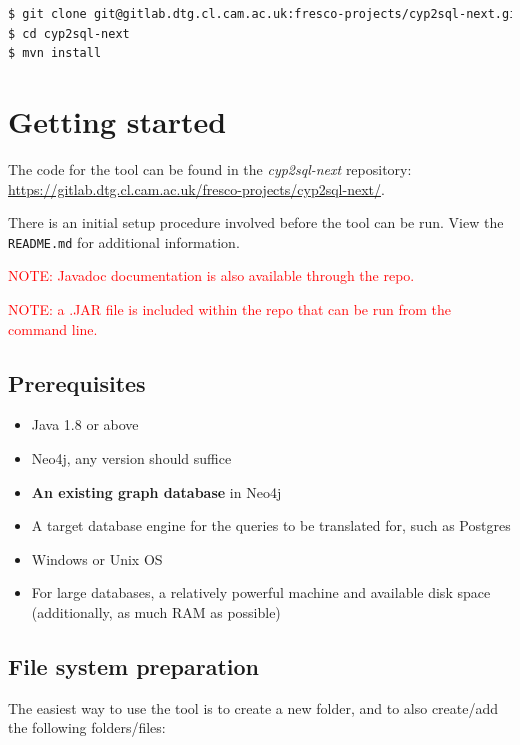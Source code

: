 \documentclass[letterpaper]{ltxdoc}
\begin{document}
\begin{lstlisting}[language=bash, breaklines=true, postbreak=\mbox{\textcolor{red}{$\hookrightarrow$}\space}, backgroundcolor=\color{gray}, basicstyle=\color{white}\ttfamily]
$ git clone git@gitlab.dtg.cl.cam.ac.uk:fresco-projects/cyp2sql-next.git
$ cd cyp2sql-next
$ mvn install
\end{lstlisting}

\section{Getting started}
The code for the tool can be found in the \emph{cyp2sql-next} repository: \url{https://gitlab.dtg.cl.cam.ac.uk/fresco-projects/cyp2sql-next/}.

\medskip

There is an initial setup procedure involved before the tool can be run. View the \texttt{README.md} for additional information.

\medskip

\textcolor{red}{NOTE: Javadoc documentation is also available through the repo.}

\medskip

\textcolor{red}{NOTE: a .JAR file is included within the repo that can be run from the command line.}

\subsection{Prerequisites}
\begin{itemize}
\item Java 1.8 or above
\item Neo4j, any version should suffice
\item \textbf{An existing graph database} in Neo4j
\item A target database engine for the queries to be translated for, such as Postgres
\item Windows or Unix OS
\item For large databases, a relatively powerful machine and available disk space (additionally, as much RAM as possible)
\end{itemize}


\subsection{File system preparation}
The easiest way to use the tool is to create a new folder, and to also create/add the following folders/files:
\end{document}
